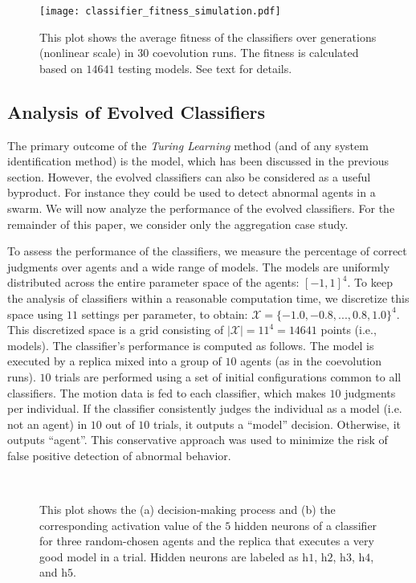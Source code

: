 \begin{figure}[!t]
	\centering
	\texttt{[image: classifier\_fitness\_simulation.pdf]}
	\caption{This plot shows the average fitness of the classifiers over generations (nonlinear scale) in $30$ coevolution runs. The fitness is calculated based on $14641$ testing models. See text for details.}
	\label{fig:classifier_fitness_swarm_simulation}
\end{figure}

\subsection{Analysis of Evolved Classifiers}\label{sec:analysis_evolved_classifiers_swarm_simulation}

The primary outcome of the \textit{Turing Learning} method (and of any system identification method) is the model, which has been discussed in the previous section. However, the evolved classifiers can also be considered as a useful byproduct. For instance they could be used to detect abnormal agents in a swarm. We will now analyze the performance of the evolved classifiers. For the remainder of this paper, we consider only the aggregation case study.

To assess the performance of the classifiers, we measure the percentage of correct judgments over agents and a wide range of models. The models are uniformly distributed across the entire parameter space of the agents: $[-1,1]^4$. To keep the analysis of classifiers within a reasonable computation time, we discretize this space using $11$ settings per parameter, to obtain: $\mathcal{X} = \{-1.0, -0.8, ..., 0.8, 1.0\}^4$. This discretized space is a grid consisting of $|\mathcal{X}|=11^4=14641$ points (i.e., models). The classifier's performance is computed as follows. The model is executed by a replica mixed into a group of $10$ agents (as in the coevolution runs). $10$ trials are performed using a set of initial configurations common to all classifiers. The motion data is fed to each classifier, which makes $10$ judgments per individual. If the classifier consistently judges the individual as a model (i.e. not an agent) in $10$ out of $10$ trials, it outputs a ``model'' decision. Otherwise, it outputs ``agent''. This conservative approach was used to minimize the risk of false positive detection of abnormal behavior.
\begin{figure}[!t]%
	\centering
		\\
		\caption{This plot shows the (a) decision-making process and (b) the corresponding activation value of the $5$ hidden neurons of a classifier for three random-chosen agents and the replica that executes a very good model in a trial. Hidden neurons are labeled as $\textrm{h}1$, $\textrm{h}2$, $\textrm{h}3$, $\textrm{h}4$, and $\textrm{h}5$.}
		\label{fig:classifier_output}
\end{figure}
